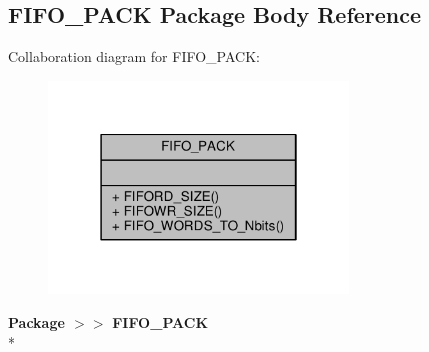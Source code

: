 \subsection{F\+I\+F\+O\+\_\+\+P\+A\+CK Package Body Reference}
\label{class__FIFO__PACK}


Collaboration diagram for F\+I\+F\+O\+\_\+\+P\+A\+CK\+:\nopagebreak
\begin{figure}[H]
\begin{center}
\leavevmode
\includegraphics[width=226pt]{df/d29/class__FIFO__PACK__coll__graph}
\end{center}
\end{figure}
{\bfseries Package $>$$>$ }{\bf F\+I\+F\+O\+\_\+\+P\+A\+CK}\\*
